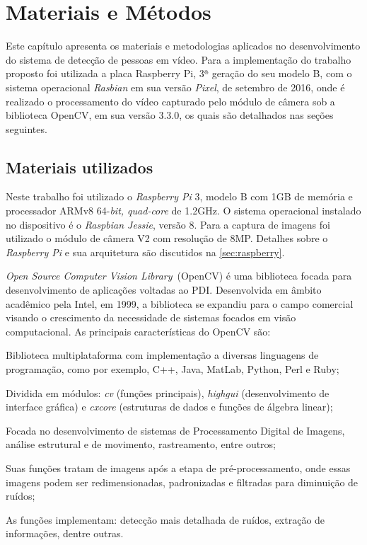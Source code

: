 \documentclass[12pt,oneside,a4paper,chapter=TITLE,section=TITLE,sumario=tradicional]{abntex2}
\begin{document}
\chapter{Materiais e Métodos}
\label{cap:metodologia}

Este capítulo apresenta os materiais e metodologias aplicados no desenvolvimento do sistema de detecção de pessoas em vídeo. Para a implementação do trabalho proposto foi utilizada a placa Raspberry Pi, 3ª geração do seu modelo B, com o sistema operacional \textit{Rasbian} em sua versão \textit{Pixel}, de setembro de 2016, onde é realizado o processamento do vídeo capturado pelo módulo de câmera sob a biblioteca OpenCV, em sua versão 3.3.0, os quais são detalhados nas seções seguintes.

\section{Materiais utilizados}

Neste trabalho foi utilizado o \textit{Raspberry Pi} 3, modelo B com 1GB de memória e processador ARMv8 64-\textit{bit, quad-core} de 1.2GHz. O sistema operacional instalado no dispositivo é o \textit{Raspbian Jessie}, versão 8. Para a captura de imagens foi utilizado o módulo de câmera V2 com resolução de 8MP. Detalhes sobre o \textit{Raspberry Pi} e sua arquitetura são discutidos na \autoref{sec:raspberry}.


\textit{Open Source Computer Vision Library}~(OpenCV) é uma biblioteca focada para desenvolvimento de aplicações voltadas ao PDI. Desenvolvida em âmbito acadêmico pela Intel, em 1999, a biblioteca se expandiu para o campo comercial visando o crescimento da necessidade de sistemas focados em visão computacional. As principais características do OpenCV são:

\begin{lista}
	    \item Biblioteca multiplataforma com implementação a diversas linguagens de programação, como por exemplo, C++, Java, MatLab, Python, Perl e Ruby;
	    \item Dividida em módulos: \textit{cv} (funções principais), \textit{highgui} (desenvolvimento de interface gráfica) e \textit{cxcore} (estruturas de dados e funções de álgebra linear);
	    \item Focada no desenvolvimento de sistemas de Processamento Digital de Imagens, análise estrutural e de movimento, rastreamento, entre outros;
	    \item Suas funções tratam de imagens após a etapa de pré-processamento, onde essas imagens podem ser redimensionadas, padronizadas e filtradas para diminuição de ruídos;
	    \item As funções implementam: detecção mais detalhada de ruídos, extração de informações, dentre outras.
\end{lista}
\end{document}
